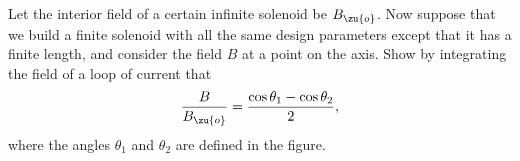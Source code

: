 Let the interior field of a certain infinite solenoid be $B_\zu{o}$.
Now suppose that we build a finite solenoid with all the same design parameters
except that it has a finite length, and consider the field $B$ at a point on
the axis. Show by integrating the field of a loop of current that
\begin{equation*}
  \frac{B}{B_\zu{o}} = \frac{\cos\theta_1-\cos\theta_2}{2},
\end{equation*}
where the angles $\theta_1$ and $\theta_2$ are defined in the figure.

